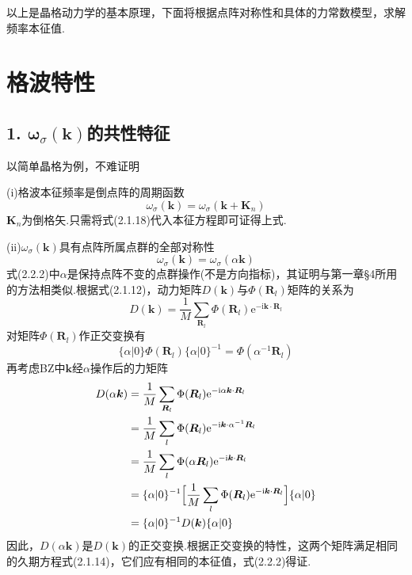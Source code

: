 以上是晶格动力学的基本原理，下面将根据点阵对称性和具体的力常数模型，求解频率本征值.

\section{格波特性}

\subsection*{1. $\boldsymbol{\omega}_{\sigma}(\boldsymbol{k})$的共性特征}

以简单晶格为例，不难证明

(i)格波本征频率是倒点阵的周期函数
\begin{equation}
  \omega_{\sigma}(\boldsymbol{k})=\omega_{\sigma}(\boldsymbol{k}+\boldsymbol{K}_n)
\end{equation}
$\boldsymbol{K}_n$为倒格矢.只需将式(2.1.18)代入本征方程即可证得上式.

(ii)$\omega_{\sigma}(\boldsymbol{k})$具有点阵所属点群的全部对称性
\begin{equation}
  \omega_{\sigma}(\boldsymbol{k})=\omega_{\sigma}(\alpha\boldsymbol{k})
\end{equation}
式(2.2.2)中$\alpha$是保持点阵不变的点群操作(不是方向指标)，其证明与第一章§4所用的方法相类似.根据式(2.1.12)，动力矩阵$D(\boldsymbol{k})$与$\Phi(\boldsymbol{R}_l)$矩阵的关系为
\begin{equation}
  D(\boldsymbol{k})=\frac{1}{M}\sum_{\boldsymbol{R}_l}
  \Phi(\boldsymbol{R}_l)\mathrm{e}^{-\mathrm{i}\boldsymbol{k}\cdot\boldsymbol{R}_l}
\end{equation}
对矩阵$\Phi(\boldsymbol{R}_l)$作正交变换有
\begin{equation*}
  \{\alpha|0\}\Phi(\boldsymbol{R}_l)\{\alpha|0\}^{-1}
  =\Phi(\alpha^{-1}\boldsymbol{R}_l)
\end{equation*}
再考虑BZ中$\boldsymbol{k}$经$\alpha$操作后的力矩阵
\begin{equation}
\begin{aligned}
  D(\alpha\boldsymbol{k})&=\frac{1}{M}\sum_{\boldsymbol{R}_l}
  \Phi(\boldsymbol{R}_l)\mathrm{e}^{-\mathrm{i}\alpha\boldsymbol{k}\cdot\boldsymbol{R}_l}\\
  &=\frac{1}{M}\sum_{l}\Phi(\boldsymbol{R}_l)
  \mathrm{e}^{-\mathrm{i}\boldsymbol{k}\cdot\alpha^{-1}\boldsymbol{R}_l}\\
  &=\frac{1}{M}\sum_{l}\Phi(\alpha\boldsymbol{R}_l)
  \mathrm{e}^{-\mathrm{i}\boldsymbol{k}\cdot\boldsymbol{R}_l}\\
  &=\{\alpha|0\}^{-1}\Bigl[\frac{1}{M}\sum_{l}\Phi(\boldsymbol{R}_l)
  \mathrm{e}^{-\mathrm{i}\boldsymbol{k}\cdot\boldsymbol{R}_l}\Bigr]\{\alpha|0\}\\
  &=\{\alpha|0\}^{-1}D(\boldsymbol{k})\{\alpha|0\}
\end{aligned}
\end{equation}
因此，$D(\alpha\boldsymbol{k})$是$D(\boldsymbol{k})$的正交变换.根据正交变换的特性，这两个矩阵满足相同的久期方程式(2.1.14)，它们应有相同的本征值，式(2.2.2)得证.

